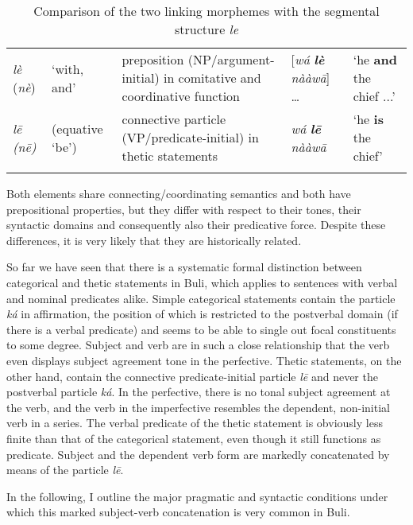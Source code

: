 \documentclass[output=paper]{langsci/langscibook}
\begin{document}
\begin{table}
\caption{Comparison of the two linking morphemes with the segmental structure \textit{le}}
\label{tab:3}


\begin{tabularx}{\textwidth}{XXXXX}
\lsptoprule

{\textit{lè} (\textit{nè})}  & {‘with, and’} & {preposition (NP/argument-initial) in comitative and coordinative function} & {[\textit{wá} \textbf{\textit{lè}}\textit{ nààw\={a}}] …} & {‘he \textbf{and} the chief ...’}\\
{\textit{l\={e} (n\={e})}} & {(equative ‘be’)} & {connective particle (VP/predicate-initial) in thetic statements} & {\textit{wá} \textbf{\textit{l\={e}}}\textit{ nààw\={a}}} & {‘he \textbf{is} the chief’}\\
\lspbottomrule
\end{tabularx}
\end{table}

Both elements share connecting/coordinating semantics and both have prepositional properties, but they differ with respect to their tones, their syntactic domains and consequently also their predicative force. Despite these differences, it is very likely that they are historically related.

So far we have seen that there is a systematic formal distinction between categorical and thetic statements in Buli, which applies to sentences with verbal and nominal predicates alike. Simple categorical statements contain the particle \textit{ká} in affirmation, the position of which is restricted to the postverbal domain (if there is a verbal predicate) and seems to be able to single out focal constituents to some degree. Subject and verb are in such a close relationship that the verb even displays subject agreement tone in the perfective. Thetic statements, on the other hand, contain the connective predicate-initial particle \textit{l\={e}} and never the postverbal particle \textit{ká}. In the perfective, there is no tonal subject agreement at the verb, and the verb in the imperfective resembles the dependent, non-initial verb in a series. The verbal predicate of the thetic statement is obviously less finite than that of the categorical statement, even though it still functions as predicate. Subject and the dependent verb form are markedly concatenated by means of the particle \textit{l\={e}}.

In the following, I outline the major pragmatic and syntactic conditions under which this marked subject-verb concatenation is very common in Buli.
\end{document}
